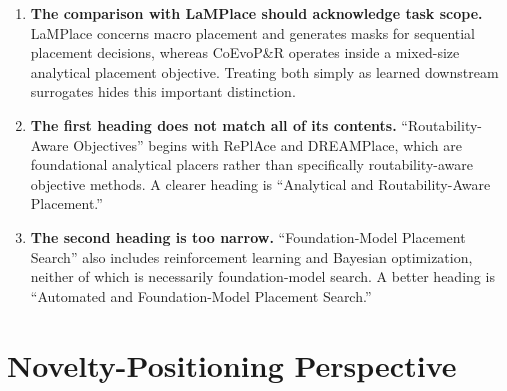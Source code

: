 \documentclass[11pt]{article}
\begin{document}
\begin{enumerate}
  The current phrase ``through masks, graph neural networks, and learned
  routability signals'' does not clearly associate each mechanism with its
  method.

  \item \textbf{The comparison with LaMPlace should acknowledge task scope.}
  LaMPlace concerns macro placement and generates masks for sequential
  placement decisions, whereas CoEvoP\&R operates inside a mixed-size
  analytical placement objective. Treating both simply as learned downstream
  surrogates hides this important distinction.

  \item \textbf{The first heading does not match all of its contents.}
  ``Routability-Aware Objectives'' begins with RePlAce and DREAMPlace, which
  are foundational analytical placers rather than specifically
  routability-aware objective methods. A clearer heading is
  ``Analytical and Routability-Aware Placement.''

  \item \textbf{The second heading is too narrow.} ``Foundation-Model
  Placement Search'' also includes reinforcement learning and Bayesian
  optimization, neither of which is necessarily foundation-model search. A
  better heading is ``Automated and Foundation-Model Placement Search.''
\end{enumerate}

\section{Novelty-Positioning Perspective}
\end{document}
